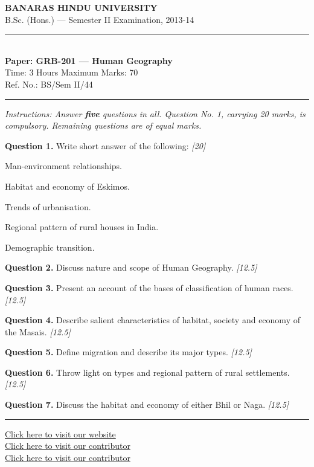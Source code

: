 \documentclass[11pt,a4paper]{article}
\newcommand{\pts}[1]{\hfill   \textit{[#1]}}
\begin{document}
\begin{center}
  {\large\bfseries BANARAS HINDU UNIVERSITY}\\[2pt]
  {\normalsize B.Sc. (Hons.) --- Semester II Examination, 2013-14}\\[6pt]
  \rule{0.8\linewidth}{0.5pt}\\[6pt]
  {\large\bfseries Paper: GRB-201 --- Human Geography}\\[4pt]
  {\normalsize Time: 3 Hours \hfill Maximum Marks: 70}\\[2pt]
  {\small Ref. No.: BS/Sem II/44}
\end{center}
\rule{\linewidth}{0.4pt}
\smallskip



\noindent   \textit{Instructions: Answer   \textbf{five} questions in all. Question No. 1, carrying 20 marks, is compulsory. Remaining questions are of equal marks.}
\bigskip




\noindent   \textbf{Question 1.} Write short answer of the following: \pts{20}

\begin{parts}
  \item Man-environment relationships.
  \item Habitat and economy of Eskimos.
  \item Trends of urbanisation.
  \item Regional pattern of rural houses in India.
  \item Demographic transition.
\end{parts}

\medskip


\noindent   \textbf{Question 2.} Discuss nature and scope of Human Geography. \pts{12.5}

\medskip


\noindent   \textbf{Question 3.} Present an account of the bases of classification of human races. \pts{12.5}

\medskip


\noindent   \textbf{Question 4.} Describe salient characteristics of habitat, society and economy of the Masais. \pts{12.5}

\medskip


\noindent   \textbf{Question 5.} Define migration and describe its major types. \pts{12.5}

\medskip


\noindent   \textbf{Question 6.} Throw light on types and regional pattern of rural settlements. \pts{12.5}

\medskip


\noindent   \textbf{Question 7.} Discuss the habitat and economy of either Bhil or Naga. \pts{12.5}

\vfill\rule{\linewidth}{0.4pt}

\begin{center}\small
\href{https://bhu-exam.vercel.app/}{Click here to visit our website}\\[4pt]
\href{https://me-aryan.vercel.app/}{Click here to visit our contributor}\\[4pt]
\href{https://quashan-me.vercel.app/}{Click here to visit our contributor}
\end{center}
\end{document}
